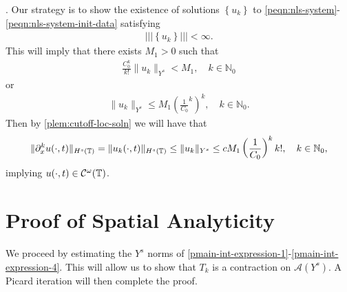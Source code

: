 \cite{Kato:2000vn}. Our strategy is to show the existence of solutions $\left\{
u_k \right\}$ to \eqref{peqn:nls-system}-\eqref{peqn:nls-system-init-data}
satisfying
%
%
\begin{equation*}
\begin{split}
  | | |\left\{ u_k \right\} | | | < \infty.
\end{split}
\end{equation*}
%
%
This will imply that there exists $M_1 >0$ such that
%
%
\begin{equation*}
\begin{split}
  \frac{C_0^k}{k!} \|u_k\|_{Y^s} < M_1, \quad k \in \mathbb{N}_0
\end{split}
\end{equation*}
%
%
or
%
%
\begin{equation*}
\begin{split}
  \|u_k\|_{Y^s} \le M_1 \left( \frac{1}{C_0}^k  \right)^k, \quad k \in
  \mathbb{N}_0.
\end{split}
\end{equation*}
%
%
Then by \cref{plem:cutoff-loc-soln} we will have that
%
%
\begin{equation*}
\begin{split}
  \|\partial_x^k u(\cdot, t) \|_{H^s(\mathbb{T})} = \|u_k(\cdot, t) \|_{H^s(\mathbb{T})} \le \|u_k
  \|_{Y^s} \le c M_1 \left( \frac{1}{C_0} \right)^k k!, \quad k \in
  \mathbb{N}_0,
\end{split}
\end{equation*}
%
%
implying $u(\cdot, t) \in \mathcal{C}^\omega (\mathbb{T})$. 
%
%
%
%
%
%
%
%
%
\section{Proof of Spatial Analyticity} 
\label{psec:proof-spat-anal}
We proceed by estimating the $Y^s$ norms of
\eqref{pmain-int-expression-1}-\eqref{pmain-int-expression-4}. This will allow us
to show that $T_k$ is a contraction on $\mathcal{A}(Y^s)$. A Picard iteration
will then complete the proof. 
%
%
